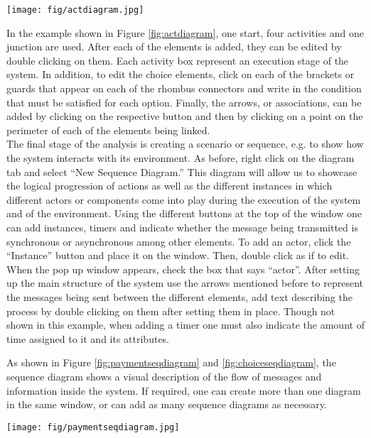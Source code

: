 \documentclass[12pt]{article}
\begin{document}
\begin{figure*}[htbp]
\centering
\texttt{[image: fig/actdiagram.jpg]}
\caption{Activity Diagram} \label{fig:actdiagram}
\end{figure*}
 
In the example shown in Figure \ref{fig:actdiagram},  one start, four activities and one junction are used.  After each of the elements is added, they can be edited by double clicking on them. Each activity box  represent an execution stage of the system. In addition, to edit the choice elements, click on each of the brackets or guards that appear on each of the rhombus connectors and write in the condition that must be satisfied for each option. Finally, the arrows, or associations, can be added by clicking on the respective button and then by clicking on a point on the perimeter of each of the elements being linked.\\

	The final stage of the analysis is creating a scenario or sequence, e.g. to show how the system interacts with its environment. As before, right click on the diagram tab and select “New Sequence Diagram.” This diagram will allow us to showcase the logical progression of actions as well as the different instances in which different actors or components come into play during the execution of the system and of the environment. Using the different buttons at the top of the window one can add instances, timers and indicate whether the message being transmitted is synchronous or asynchronous among other elements. 
To add an actor, click the “Instance” button and place it on the window. Then, double click as if to edit. When the pop up window appears, check the box that says “actor”. After setting up the main structure of the system use the arrows mentioned before to represent the messages being sent between the different elements, add text describing the process by double clicking on them after setting them in place. Though not shown in this example, when adding a timer one must also indicate the amount of time assigned to it and its attributes.

As shown in Figure \ref{fig:paymentseqdiagram} and \ref{fig:choiceseqdiagram}, the sequence diagram shows  a visual description of the flow of messages and information inside the system. If required, one can create more than one diagram in the same window, or can add as many sequence diagrams as necessary.

\begin{figure*}[htbp]
\centering
\texttt{[image: fig/paymentseqdiagram.jpg]}
\caption{Logical progession of the `Payment' sequence diagram} \label{fig:paymentseqdiagram}
\end{figure*}
\end{document}
